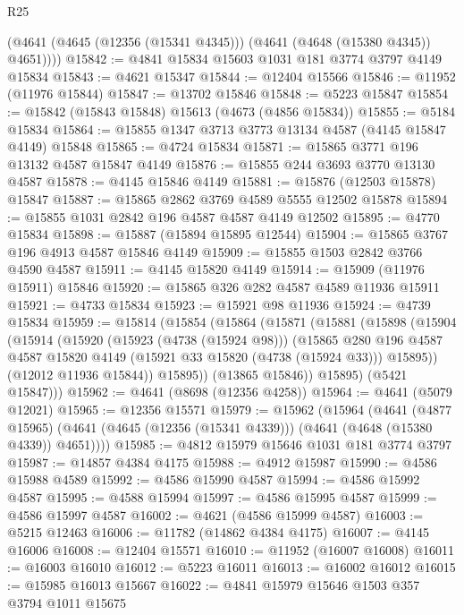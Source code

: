 \begin{lexlean}{R25}
\begin{coremodule}
        (@4641 (@4645 (@12356 (@15341 @4345))) (@4641 (@4648 (@15380 @4345)) @4651))))
@15842 := @4841 @15834 @15603 @1031 @181 @3774 @3797 @4149 @15834
@15843 := @4621 @15347
@15844 := @12404 @15566
@15846 := @11952 (@11976 @15844)
@15847 := @13702 @15846
@15848 := @5223 @15847
@15854 := @15842 (@15843 @15848) @15613 (@4673 (@4856 @15834))
@15855 := @5184 @15834
@15864 := @15855 @1347 @3713 @3773 @13134 @4587 (@4145 @15847 @4149) @15848
@15865 := @4724 @15834
@15871 := @15865 @3771 @196 @13132 @4587 @15847 @4149
@15876 := @15855 @244 @3693 @3770 @13130 @4587
@15878 := @4145 @15846 @4149
@15881 := @15876 (@12503 @15878) @15847
@15887 := @15865 @2862 @3769 @4589 @5555 @12502 @15878
@15894 := @15855 @1031 @2842 @196 @4587 @4587 @4149 @12502
@15895 := @4770 @15834
@15898 := @15887 (@15894 @15895 @12544)
@15904 := @15865 @3767 @196 @4913 @4587 @15846 @4149
@15909 := @15855 @1503 @2842 @3766 @4590 @4587
@15911 := @4145 @15820 @4149
@15914 := @15909 (@11976 @15911) @15846
@15920 := @15865 @326 @282 @4587 @4589 @11936 @15911
@15921 := @4733 @15834
@15923 := @15921 @98 @11936
@15924 := @4739 @15834
@15959 := @15814
    (@15854
      (@15864
        (@15871
          (@15881
            (@15898
              (@15904
                (@15914
                  (@15920
                    (@15923 (@4738 (@15924 @98)))
                    (@15865
                      @280
                      @196
                      @4587
                      @4587
                      @15820
                      @4149
                      (@15921 @33 @15820 (@4738 (@15924 @33)))
                      @15895))
                  (@12012 @11936 @15844))
                @15895))
            (@13865 @15846))
          @15895)
        (@5421 @15847)))
@15962 := @4641 (@8698 (@12356 @4258))
@15964 := @4641 (@5079 @12021)
@15965 := @12356 @15571
@15979 := @15962
    (@15964
      (@4641
        (@4877 @15965)
        (@4641 (@4645 (@12356 (@15341 @4339))) (@4641 (@4648 (@15380 @4339)) @4651))))
@15985 := @4812 @15979 @15646 @1031 @181 @3774 @3797
@15987 := @14857 @4384 @4175
@15988 := @4912 @15987
@15990 := @4586 @15988 @4589
@15992 := @4586 @15990 @4587
@15994 := @4586 @15992 @4587
@15995 := @4588 @15994
@15997 := @4586 @15995 @4587
@15999 := @4586 @15997 @4587
@16002 := @4621 (@4586 @15999 @4587)
@16003 := @5215 @12463
@16006 := @11782 (@14862 @4384 @4175)
@16007 := @4145 @16006
@16008 := @12404 @15571
@16010 := @11952 (@16007 @16008)
@16011 := @16003 @16010
@16012 := @5223 @16011
@16013 := @16002 @16012
@16015 := @15985 @16013 @15667
@16022 := @4841 @15979 @15646 @1503 @357 @3794 @1011 @15675

\end{coremodule}
\end{lexlean}

